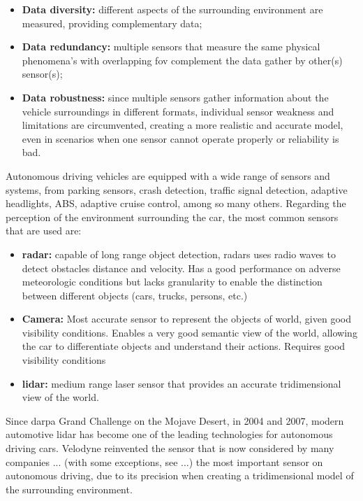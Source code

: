 \begin{itemize}
	\item \textbf{Data diversity:} different aspects of the surrounding environment are measured, providing complementary data;
	\item \textbf{Data redundancy:} multiple sensors that measure the same physical phenomena's with overlapping \ac{fov} complement the data gather by other(s) sensor(s);
	\item \textbf{Data robustness:} since multiple sensors gather information about the vehicle surroundings in different formats, individual sensor weakness and limitations are circumvented, creating a more realistic and accurate model, even in scenarios when one sensor cannot operate properly or reliability is bad.
\end{itemize}

Autonomous driving vehicles are equipped with a wide range of sensors and systems, from parking sensors, crash detection, traffic signal detection, adaptive headlights, \ac{ABS}, adaptive cruise control, among so many others. Regarding the perception of the environment surrounding the car, the most common sensors that are used are:

\begin{itemize}
	\item \textbf{\ac{radar}:} capable of long range object detection, \acp{radar} uses radio waves to detect obstacles distance and velocity. Has a good performance on adverse meteorologic conditions but lacks granularity to enable the distinction between different objects (cars, trucks, persons, etc.)
	\item \textbf{Camera:} Most accurate sensor to represent the objects of world, given good visibility conditions. Enables a very good semantic view of the world, allowing the car to differentiate objects and understand their actions. Requires good visibility conditions 
	\item \textbf{\ac{lidar}:} medium range laser sensor that provides an accurate tridimensional view of the world.
\end{itemize}


Since \ac{darpa} Grand Challenge on the Mojave Desert, in 2004 and 2007, modern automotive \ac{lidar} has become one of the leading technologies for autonomous driving cars. Velodyne reinvented the sensor that is now considered by many companies ...  (with some exceptions, see ...) the most important sensor on autonomous driving, due to its precision when creating a tridimensional  model of the surrounding environment.


